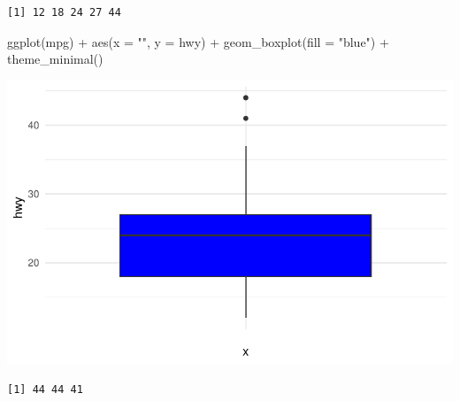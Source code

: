 \documentclass[
  letterpaper,
  DIV=11,
  numbers=noendperiod]{scrreprt}
\newenvironment{Shaded}{\begin{snugshade}}{\end{snugshade}}
\newcommand{\AttributeTok}[1]{\textcolor[rgb]{0.40,0.45,0.13}{#1}}
\newcommand{\CommentTok}[1]{\textcolor[rgb]{0.37,0.37,0.37}{#1}}
\newcommand{\FunctionTok}[1]{\textcolor[rgb]{0.28,0.35,0.67}{#1}}
\newcommand{\NormalTok}[1]{\textcolor[rgb]{0.00,0.23,0.31}{#1}}
\newcommand{\OtherTok}[1]{\textcolor[rgb]{0.00,0.23,0.31}{#1}}
\newcommand{\SpecialCharTok}[1]{\textcolor[rgb]{0.37,0.37,0.37}{#1}}
\newcommand{\StringTok}[1]{\textcolor[rgb]{0.13,0.47,0.30}{#1}}
\begin{document}
\begin{verbatim}
[1] 12 18 24 27 44
\end{verbatim}

\begin{Shaded}
\begin{Highlighting}[]
\FunctionTok{ggplot}\NormalTok{(mpg) }\SpecialCharTok{+}
  \FunctionTok{aes}\NormalTok{(}\AttributeTok{x =} \StringTok{""}\NormalTok{, }\AttributeTok{y =}\NormalTok{ hwy) }\SpecialCharTok{+}
  \FunctionTok{geom\_boxplot}\NormalTok{(}\AttributeTok{fill =} \StringTok{"blue"}\NormalTok{) }\SpecialCharTok{+}
  \FunctionTok{theme\_minimal}\NormalTok{()}
\end{Highlighting}
\end{Shaded}

\includegraphics{data_preprocess_files/figure-pdf/unnamed-chunk-13-1.pdf}

\begin{Shaded}
\end{Shaded}

\begin{verbatim}
[1] 44 44 41
\end{verbatim}

\begin{Shaded}
\end{Shaded}
\end{document}
